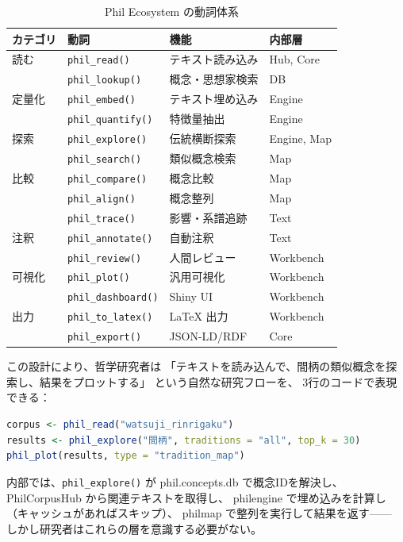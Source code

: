 \documentclass[a4paper,11pt]{ltjsarticle}
\begin{document}
\begin{table}[H]
\centering
\caption{Phil Ecosystem の動詞体系}
\label{tab:verbs}
\small
\begin{tabular}{llll}
\toprule
\textbf{カテゴリ} & \textbf{動詞} & \textbf{機能} & \textbf{内部層} \\
\midrule
読む & \texttt{phil\_read()} & テキスト読み込み & Hub, Core \\
     & \texttt{phil\_lookup()} & 概念・思想家検索 & DB \\
\midrule
定量化 & \texttt{phil\_embed()} & テキスト埋め込み & Engine \\
       & \texttt{phil\_quantify()} & 特徴量抽出 & Engine \\
\midrule
探索 & \texttt{phil\_explore()} & 伝統横断探索 & Engine, Map \\
     & \texttt{phil\_search()} & 類似概念検索 & Map \\
\midrule
比較 & \texttt{phil\_compare()} & 概念比較 & Map \\
     & \texttt{phil\_align()} & 概念整列 & Map \\
     & \texttt{phil\_trace()} & 影響・系譜追跡 & Text \\
\midrule
注釈 & \texttt{phil\_annotate()} & 自動注釈 & Text \\
     & \texttt{phil\_review()} & 人間レビュー & Workbench \\
\midrule
可視化 & \texttt{phil\_plot()} & 汎用可視化 & Workbench \\
       & \texttt{phil\_dashboard()} & Shiny UI & Workbench \\
\midrule
出力 & \texttt{phil\_to\_latex()} & LaTeX 出力 & Workbench \\
     & \texttt{phil\_export()} & JSON-LD/RDF & Core \\
\bottomrule
\end{tabular}
\end{table}

この設計により、哲学研究者は
「テキストを読み込んで、間柄の類似概念を探索し、結果をプロットする」
という自然な研究フローを、
3行のコードで表現できる：

\begin{lstlisting}[language=R,caption=Phil Ecosystem の基本的なワークフロー]
corpus <- phil_read("watsuji_rinrigaku")
results <- phil_explore("間柄", traditions = "all", top_k = 30)
phil_plot(results, type = "tradition_map")
\end{lstlisting}

内部では、\texttt{phil\_explore()} が
phil.concepts.db で概念IDを解決し、
PhilCorpusHub から関連テキストを取得し、
philengine で埋め込みを計算し（キャッシュがあればスキップ）、
philmap で整列を実行して結果を返す——
しかし研究者はこれらの層を意識する必要がない。
\end{document}
